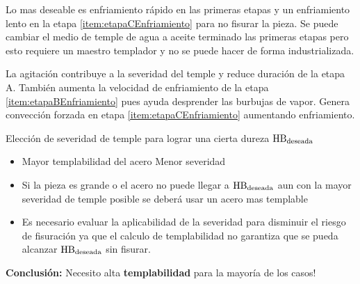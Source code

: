 Lo mas deseable es enfriamiento rápido en las primeras etapas y un enfriamiento lento en la etapa \ref{item:etapaCEnfriamiento} para no fisurar la pieza. Se puede cambiar el medio de temple de agua a aceite terminado las primeras etapas pero esto requiere un maestro templador y no se puede hacer de forma industrializada.

La agitación contribuye a la severidad del temple y reduce  duración de la etapa A. También aumenta la velocidad de enfriamiento de la etapa \ref{item:etapaBEnfriamiento} pues ayuda desprender las burbujas de vapor. Genera convección forzada en etapa \ref{item:etapaCEnfriamiento}  aumentando enfriamiento.

Elección de severidad de temple para lograr una cierta dureza $\mathrm{HB}_{\mathrm{deseada}}$
\begin{itemize}
    \item Mayor templabilidad del acero \goright Menor severidad
    \item Si la pieza es grande o el acero no puede llegar a $\mathrm{HB}_{\mathrm{deseada}}$ aun con la mayor severidad de temple posible se deberá usar un acero mas templable
    \item Es necesario evaluar la aplicabilidad de la severidad para disminuir el riesgo de fisuración ya que el calculo de templabilidad no garantiza que se pueda alcanzar $\mathrm{HB}_{\mathrm{deseada}}$ sin fisurar.
\end{itemize}
\textbf{Conclusión:} Necesito alta \textbf{templabilidad} para la mayoría de los casos!

